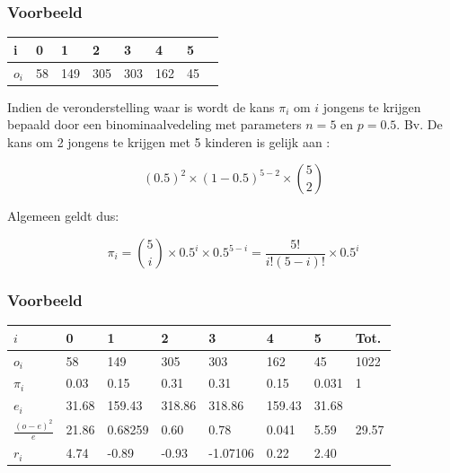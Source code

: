 \documentclass[aspectratio=169]{beamer}
\begin{document}
\begin{frame}
  \frametitle{Voorbeeld}
  \begin{table}[h]
\begin{tabular}{@{}llllllll@{}}
\toprule
i       & 0  & 1   & 2   & 3   & 4   & 5  &  \\ \midrule
$o_{i}$ & 58 & 149 & 305 & 303 & 162 & 45 &  \\ \bottomrule
\end{tabular}
\end{table}
\pause
Indien de veronderstelling waar is wordt de kans $\pi_{i}$ om $i$ jongens te krijgen bepaald door een binominaalvedeling met parameters $n=5$ en $p=0.5$.
Bv. De kans om 2 jongens te krijgen met 5 kinderen is gelijk aan :

\[ (0.5)^{2} \times (1-0.5)^{5-2} \times \binom{5}{2} \]

Algemeen geldt dus:

\[ \pi_{i} = \binom{5}{i}\times 0.5^{i} \times 0.5^{5-i} = \frac{5!}{i!(5-i)!}\times 0.5^{i} \]
\end{frame}

\begin{frame}
  \frametitle{Voorbeeld}
  \begin{table}[h]
\begin{tabular}{@{}llllllll@{}}
	\toprule
	$i$                   & 0     & 1       & 2      & 3        & 4      & 5     & Tot.  \\ \midrule
	$o_i$                 & 58    & 149     & 305    & 303      & 162    & 45    & 1022  \\
	$\pi_i$               & 0.03  & 0.15    & 0.31   & 0.31     & 0.15   & 0.031 & 1     \\
	$e_i$                 & 31.68 & 159.43  & 318.86 & 318.86   & 159.43 & 31.68 &       \\
	$\frac{(o-e)^{2}}{e}$ & 21.86 & 0.68259 & 0.60   & 0.78     & 0.041  & 5.59  & 29.57 \\
	$r_i$                 & 4.74  & -0.89   & -0.93  & -1.07106 & 0.22   & 2.40  &       \\ \bottomrule
\end{tabular}
\end{table}
\end{frame}
\end{document}

